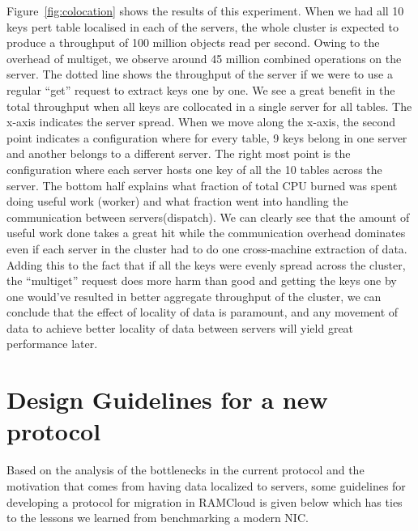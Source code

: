 Figure~\ref{fig:colocation} shows the results of this experiment. When we had all 10 keys pert table localised in each of the servers, the whole cluster is expected to produce a throughput of 100 million objects read per second.
Owing to the overhead of multiget, we observe around 45 million combined operations on the server. The dotted line shows the throughput of the server if we were to use a regular ``get'' request to extract keys one by one.
We see a great benefit in the total throughput when all keys are collocated in a single server for all tables. The x-axis indicates the server spread. When we move along the x-axis, the second point indicates a configuration where for every table, 9 keys belong in one server and 
another belongs to a different server. The right most point is the configuration where each server hosts one key of all the 10 tables across the server. The bottom half explains what fraction of total CPU burned was spent 
doing useful work (worker) and what fraction went into handling the communication between servers(dispatch). 
We can clearly see that the amount of useful work done takes a great hit while the communication overhead dominates 
even if each server in the cluster had to do one cross-machine extraction of data. Adding this to the fact that if all the keys were evenly spread across the cluster, the ``multiget'' request does more harm than good and getting the 
keys one by one would've resulted in better aggregate throughput of the cluster, we can conclude that the effect of locality of data is paramount, and any movement of data to achieve better locality of data between servers will yield 
great performance later.


\clearpage
\section{Design Guidelines for a new protocol}
Based on the analysis of the bottlenecks in the current protocol and the motivation that comes from having data localized to servers, some guidelines for developing a protocol for migration in RAMCloud
is given below which has ties to the lessons we learned from benchmarking a modern NIC.

